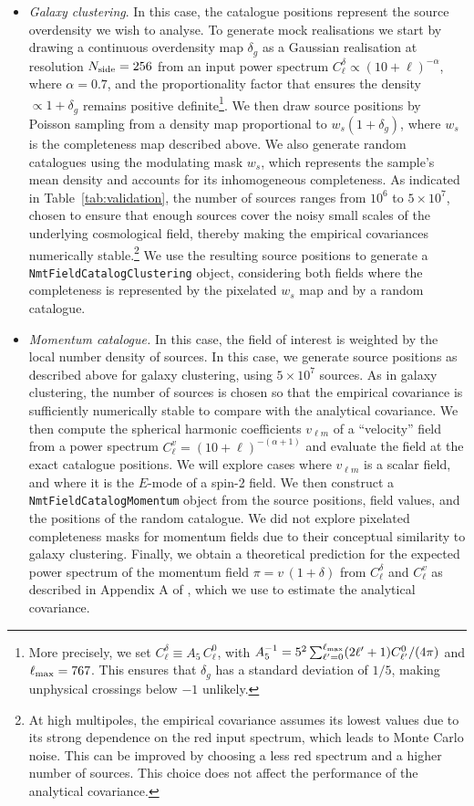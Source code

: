 \documentclass[%
 reprint,
superscriptaddress,
nofootinbib,
 amsmath,amssymb,
 aps,
 prd,
]{revtex4-2}
\begin{document}
\begin{itemize}
      \item {\it Galaxy clustering}. In this case, the catalogue positions represent the source overdensity we wish to analyse. To generate mock realisations we start by drawing a continuous overdensity map $\delta_g$ as a Gaussian realisation at resolution $N_{\rm side}=256$ from an input power spectrum $C_\ell^\delta \propto (10+\ell)^{-\alpha}$, where $\alpha=0.7$, and the proportionality factor that ensures the density $\propto1+\delta_g$ remains positive definite\footnote{More precisely, we set $C_\ell^\delta\equiv A_5\, C^0_\ell$, with $A_5^{-1}=5^2\sum_{\ell'=0}^{\ell_{\rm max}}(2\ell'+1)C_{\ell'}^0/(4\pi)$ and $\ell_{\rm max}=767$. This ensures that $\delta_g$ has a standard deviation of $1/5$, making unphysical crossings below $-1$ unlikely.}. We then draw source positions by Poisson sampling from a density map proportional to $w_s(1+\delta_g)$, where $w_s$ is the completeness map described above. We also generate random catalogues using the modulating mask $w_s$, which represents the sample's mean density and accounts for its inhomogeneous completeness. As indicated in Table~\ref{tab:validation}, the number of sources ranges from $10^6$ to $5\times10^7$, chosen to ensure that enough sources cover the noisy small scales of the underlying cosmological field, thereby making the empirical covariances numerically stable.\footnote{At high multipoles, the empirical covariance assumes its lowest values due to its strong dependence on the red input spectrum, which leads to Monte Carlo noise. This can be improved by choosing a less red spectrum and a higher number of sources. This choice does not affect the performance of the analytical covariance.} We use the resulting source positions to generate a \texttt{NmtFieldCatalogClustering} object, considering both fields where the completeness is represented by the pixelated $w_s$ map and by a random catalogue.
      \item {\it Momentum catalogue.} In this case, the field of interest is weighted by the local number density of sources. In this case, we generate source positions as described above for galaxy clustering, using $5\times 10^7$ sources. As in galaxy clustering, the number of sources is chosen so that the empirical covariance is sufficiently numerically stable to compare with the analytical covariance. We then compute the spherical harmonic coefficients $v_{\ell m}$ of a ``velocity'' field from a power spectrum $C_\ell^v=(10+\ell)^{-(\alpha+1)}$ and evaluate the field at the exact catalogue positions. We will explore cases where $v_{\ell m}$ is a scalar field, and where it is the $E$-mode of a spin-2 field. We then construct a \texttt{NmtFieldCatalogMomentum} object from the source positions, field values, and the positions of the random catalogue. We did not explore pixelated completeness masks for momentum fields due to their conceptual similarity to galaxy clustering. Finally, we obtain a theoretical prediction for the expected power spectrum of the momentum field $\pi=v\,(1+\delta)$ from $C_\ell^\delta$ and $C_\ell^v$ as described in Appendix A of \cite{2512.14625}, which we use to estimate the analytical covariance.
    \end{itemize}
    
\end{document}
